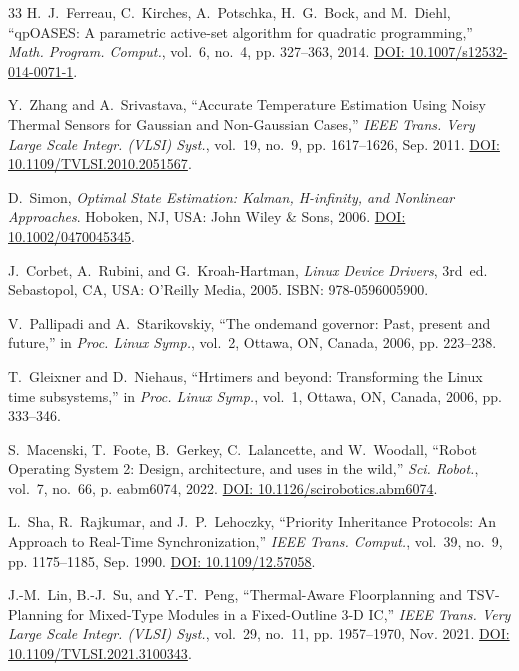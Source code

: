 \documentclass[journal]{IEEEtran}
\begin{document}
\begin{thebibliography}{33}
H.~J.~Ferreau, C.~Kirches, A.~Potschka, H.~G.~Bock, and M.~Diehl, ``qpOASES: A parametric active-set algorithm for quadratic programming,'' \emph{Math. Program. Comput.}, vol.~6, no.~4, pp. 327--363, 2014. \href{https://doi.org/10.1007/s12532-014-0071-1}{DOI: 10.1007/s12532-014-0071-1}.

Y.~Zhang and A.~Srivastava, ``Accurate Temperature Estimation Using Noisy Thermal Sensors for Gaussian and Non-Gaussian Cases,'' \emph{IEEE Trans. Very Large Scale Integr. (VLSI) Syst.}, vol.~19, no.~9, pp. 1617--1626, Sep. 2011. \href{https://doi.org/10.1109/TVLSI.2010.2051567}{DOI: 10.1109/TVLSI.2010.2051567}.

D.~Simon, \emph{Optimal State Estimation: Kalman, H-infinity, and Nonlinear Approaches}. Hoboken, NJ, USA: John Wiley \& Sons, 2006. \href{https://doi.org/10.1002/0470045345}{DOI: 10.1002/0470045345}.

J.~Corbet, A.~Rubini, and G.~Kroah-Hartman, \emph{Linux Device Drivers}, 3rd~ed. Sebastopol, CA, USA: O'Reilly Media, 2005. ISBN: 978-0596005900.

V.~Pallipadi and A.~Starikovskiy, ``The ondemand governor: Past, present and future,'' in \emph{Proc. Linux Symp.}, vol.~2, Ottawa, ON, Canada, 2006, pp. 223--238.

T.~Gleixner and D.~Niehaus, ``Hrtimers and beyond: Transforming the Linux time subsystems,'' in \emph{Proc. Linux Symp.}, vol.~1, Ottawa, ON, Canada, 2006, pp. 333--346.

S.~Macenski, T.~Foote, B.~Gerkey, C.~Lalancette, and W.~Woodall, ``Robot Operating System 2: Design, architecture, and uses in the wild,'' \emph{Sci. Robot.}, vol.~7, no.~66, p. eabm6074, 2022. \href{https://doi.org/10.1126/scirobotics.abm6074}{DOI: 10.1126/scirobotics.abm6074}.

L.~Sha, R.~Rajkumar, and J.~P.~Lehoczky, ``Priority Inheritance Protocols: An Approach to Real-Time Synchronization,'' \emph{IEEE Trans. Comput.}, vol.~39, no.~9, pp. 1175--1185, Sep. 1990. \href{https://doi.org/10.1109/12.57058}{DOI: 10.1109/12.57058}.

J.-M.~Lin, B.-J.~Su, and Y.-T.~Peng, ``Thermal-Aware Floorplanning and TSV-Planning for Mixed-Type Modules in a Fixed-Outline 3-D IC,'' \emph{IEEE Trans. Very Large Scale Integr. (VLSI) Syst.}, vol.~29, no.~11, pp. 1957--1970, Nov. 2021. \href{https://doi.org/10.1109/TVLSI.2021.3100343}{DOI: 10.1109/TVLSI.2021.3100343}.
\end{thebibliography}
\end{document}
